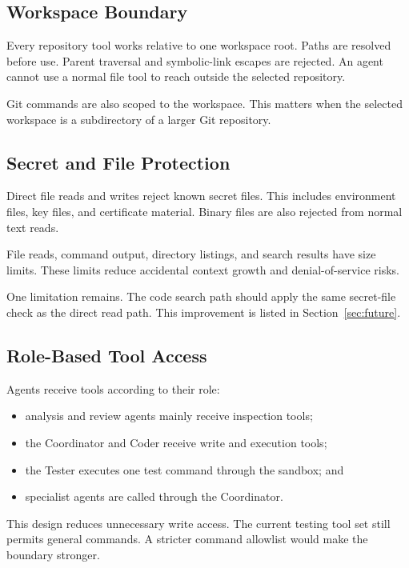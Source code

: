 \documentclass[11pt,a4paper]{article}
\begin{document}
\subsection{Workspace Boundary}

Every repository tool works relative to one workspace root. Paths are resolved
before use. Parent traversal and symbolic-link escapes are rejected. An agent
cannot use a normal file tool to reach outside the selected repository.

Git commands are also scoped to the workspace. This matters when the selected
workspace is a subdirectory of a larger Git repository.

\subsection{Secret and File Protection}

Direct file reads and writes reject known secret files. This includes
environment files, key files, and certificate material. Binary files are also
rejected from normal text reads.

File reads, command output, directory listings, and search results have size
limits. These limits reduce accidental context growth and denial-of-service
risks.

One limitation remains. The code search path should apply the same secret-file
check as the direct read path. This improvement is listed in
Section~\ref{sec:future}.

\subsection{Role-Based Tool Access}

Agents receive tools according to their role:

\begin{itemize}
  \item analysis and review agents mainly receive inspection tools;
  \item the Coordinator and Coder receive write and execution tools;
  \item the Tester executes one test command through the sandbox; and
  \item specialist agents are called through the Coordinator.
\end{itemize}

This design reduces unnecessary write access. The current testing tool set
still permits general commands. A stricter command allowlist would make the
boundary stronger.
\end{document}
